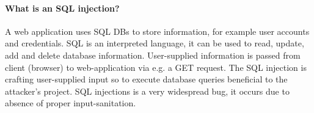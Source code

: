 \paragraph{What is an SQL injection?}
A web application uses SQL DBs to store information, for example user accounts and credentials. SQL is an interpreted language, it can be used to read, update, add and delete database information. User-supplied information is passed from client (browser) to web-application via e.g. a GET request. The SQL injection is crafting user-supplied input so to execute database queries beneficial to the attacker's project. SQL injections is a very widespread bug, it occurs due to absence of proper input-sanitation. 